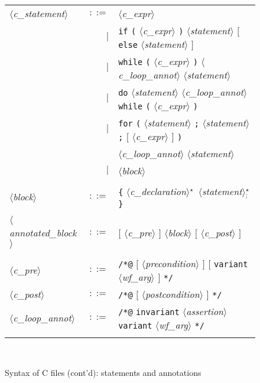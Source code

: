 \documentclass[a4paper,12pt]{report}
\newcommand{\te}[1]{\texttt{#1}}
\newcommand{\nt}[1]{$\langle$\textsl{#1}$\rangle$}
\newcommand{\etoile}{$^{\star}$}
\newcommand{\etoilesep}[1]{$^{\star}_#1$}
\begin{document}
\begin{figure}[htbp]
\begin{center}
\hrulefill\\
\begin{tabular}{lrl}
  \nt{c\_statement}
    & $::=$ & \nt{c\_expr} \\
    &   $|$ & \te{if} \te{(} \nt{c\_expr} \te{)} \nt{statement} 
              $[$ \te{else} \nt{statement} $]$ \\
    &   $|$ & \te{while} \te{(} \nt{c\_expr} \te{)}
              \nt{c\_loop\_annot} \nt{statement} \\
    &   $|$ & \te{do} \nt{statement} \nt{c\_loop\_annot} 
              \te{while} \te{(} \nt{c\_expr} \te{)} \\
    &   $|$ & \te{for} \te{(} \nt{statement} \te{;} \nt{statement} \te{;}
              $[$ \nt{c\_expr} $]$ \te{)} \\
           && \nt{c\_loop\_annot} \nt{statement} \\
    &   $|$ & \nt{block} \\
  \\[0.1em]

  \nt{block}
    & $::=$ & \te{\{} \nt{c\_declaration}\etoile\ 
              \nt{statement}\etoilesep{\te{;}} \te{\}}\\
  \\[0.1em]

  \nt{annotated\_block}
    & $::=$ & $[$ \nt{c\_pre} $]$ \nt{block} $[$ \nt{c\_post} $]$ \\
  \\[0.1em]

  \nt{c\_pre}
    & $::=$ & \te{/*@} $[$ \nt{precondition} $]$ $[$ \te{variant} \nt{wf\_arg}
              $]$ \te{*/}  \\
  \nt{c\_post}
    & $::=$ & \te{/*@} $[$ \nt{postcondition} $]$ \te{*/}  \\
  \nt{c\_loop\_annot}
    & $::=$ & \te{/*@} \te{invariant} \nt{assertion} 
              \te{variant} \nt{wf\_arg} \te{*/}  \\
  \\[0.1em]

\end{tabular}\\
\hrulefill
\caption{Syntax of C files (cont'd): statements and annotations}
\label{fig:cfiles:b}
\end{center}           
\end{figure}


\nocite{*}




\newpage
{}
\printindex
\end{document}
